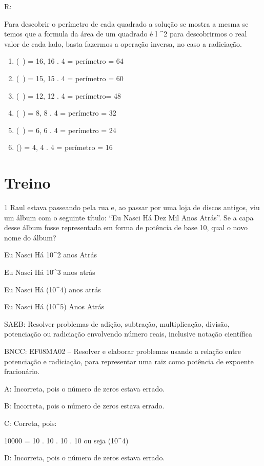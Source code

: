 R:

Para descobrir o perímetro de cada quadrado a solução se mostra a mesma
se temos que a formula da área de um quadrado é l ^2 para descobrirmos o
real valor de cada lado, basta fazermos a operação inversa, no caso a
radiciação.

\begin{enumerate}
\def\labelenumi{\alph{enumi})}
\item
  (\ ) = 16, 16 . 4 = perímetro = 64
\item
  (\ ) = 15, 15 . 4 = perímetro = 60
\item
  (\ ) = 12, 12 . 4 = perímetro= 48
\item
  (\ ) = 8, 8 . 4 = perímetro = 32
\item
  (\ ) = 6, 6 . 4 = perímetro = 24
\item
  () = 4, 4 . 4 = perímetro = 16
\end{enumerate}

\section{Treino}

\num{1} Raul estava passeando pela rua e, ao passar por uma loja de discos
antigos, viu um álbum com o seguinte título: ``Eu Nasci Há Dez Mil Anos
Atrás''. Se a capa desse álbum fosse representada em forma de potência
de base 10, qual o novo nome do álbum?
\item Eu Nasci Há 10^2 anos Atrás
\item Eu Nasci Há 10^3 anos atrás
\item Eu Nasci Há (10^4) anos atrás
\item Eu Nasci Há (10^5) Anos Atrás

SAEB: Resolver problemas de adição, subtração, multiplicação, divisão,
potenciação ou radiciação envolvendo número reais, inclusive notação
científica

BNCC: EF08MA02 -- Resolver e elaborar problemas usando a relação entre
potenciação e radiciação, para representar uma raiz como potência de
expoente fracionário.

A: Incorreta, pois o número de zeros estava errado.

B: Incorreta, pois o número de zeros estava errado.

C: Correta, pois:

10000 = 10 . 10 . 10 . 10 ou seja (10^4)

D: Incorreta, pois o número de zeros estava errado.

